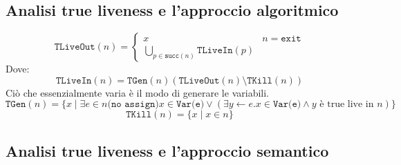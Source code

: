 \subsection{Analisi true liveness e l'approccio algoritmico}
\begin{equation}
    \texttt{TLiveOut}(n) =
        \begin{cases}
            x & n = \texttt{exit}\\
            \bigcup_{p \in \texttt{succ}(n)} \texttt{TLiveIn}(p)
        \end{cases}
\end{equation}
Dove:
\begin{equation}
    \texttt{TLiveIn}(n) = \texttt{TGen}(n) ( \texttt{TLiveOut}(n) \setminus \texttt{TKill}(n))
\end{equation}
Ciò che essenzialmente varia è il modo di generare le variabili.
\begin{equation}
    \texttt{TGen}(n) = \{x \mid \exists e \in n \texttt{(no assign)} x \in \texttt{Var(e)} \lor 
    (\exists y \gets e . x \in \texttt{Var(e)} \land y\text{ è true live in }n)\}
\end{equation}
\begin{equation}
    \texttt{TKill}(n) = \{x \mid x \in n\}
\end{equation}
\subsection{Analisi true liveness e l'approccio semantico}
